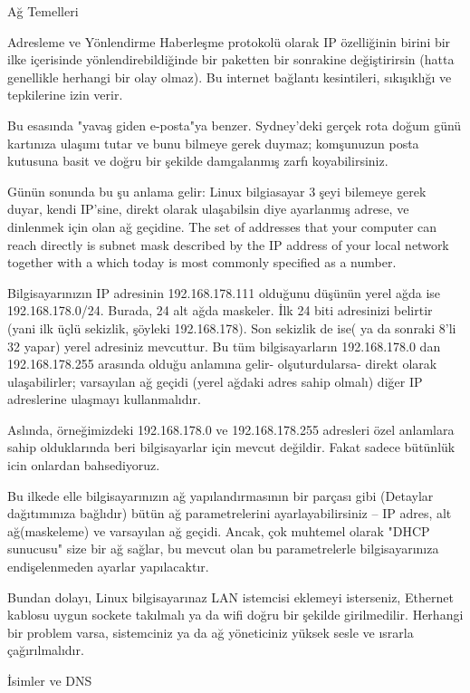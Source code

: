 \begin{section}{Ağ Temelleri}
\begin{subsection}{Adresleme ve Yönlendirme}
Haberleşme protokolü olarak IP özelliğinin birini bir ilke içerisinde yönlendirebildiğinde bir paketten bir sonrakine değiştirirsin (hatta genellikle herhangi bir olay olmaz). Bu internet bağlantı kesintileri, sıkışıklığı ve tepkilerine izin verir.

Bu esasında "yavaş giden e-posta"ya benzer. Sydney'deki gerçek rota doğum günü kartınıza ulaşımı tutar ve bunu bilmeye gerek duymaz; komşunuzun posta kutusuna basit ve doğru bir şekilde damgalanmış zarfı koyabilirsiniz.

Günün sonunda bu şu anlama gelir: Linux bilgiasayar 3 şeyi bilemeye gerek duyar, kendi IP'sine, direkt olarak ulaşabilsin diye ayarlanmış adrese, ve dinlenmek için olan ağ geçidine. The set of addresses that your computer can reach directly is subnet mask described by the IP address of your local network together with a which today is most commonly specified as a number.

Bilgisayarınızın IP adresinin 192.168.178.111 olduğunu düşünün yerel ağda ise 192.168.178.0/24. Burada, 24 alt ağda maskeler. İlk 24 biti adresinizi belirtir (yani ilk üçlü sekizlik, şöyleki 192.168.178). Son sekizlik de ise( ya da sonraki 8'li 32 yapar) yerel adresiniz mevcuttur. Bu tüm bilgisayarların 192.168.178.0 dan 192.168.178.255 arasında olduğu anlamına gelir- olşuturdularsa- direkt olarak ulaşabilirler; varsayılan ağ geçidi (yerel ağdaki adres sahip olmalı) diğer IP adreslerine ulaşmayı kullanmalıdır. 

Aslında, örneğimizdeki 192.168.178.0 ve 192.168.178.255 adresleri özel anlamlara sahip olduklarında beri bilgisayarlar için mevcut değildir. Fakat sadece bütünlük icin onlardan bahsediyoruz.

Bu ilkede elle bilgisayarınızın ağ yapılandırmasının bir parçası gibi (Detaylar dağıtımınıza bağlıdır) bütün ağ parametrelerini ayarlayabilirsiniz -- IP adres, alt ağ(maskeleme) ve varsayılan ağ geçidi. Ancak, çok muhtemel olarak "DHCP sunucusu" size bir ağ sağlar, bu mevcut olan bu parametrelerle bilgisayarınıza endişelenmeden ayarlar yapılacaktır.

Bundan dolayı, Linux bilgisayarınaz LAN istemcisi eklemeyi isterseniz, Ethernet kablosu uygun sockete takılmalı ya da wifi doğru bir şekilde girilmedilir. Herhangi bir problem varsa, sistemciniz ya da ağ yöneticiniz yüksek sesle ve ısrarla çağırılmalıdır.

\end{subsection}
\begin{subsection}{İsimler ve DNS}


\end{subsection}
\end{section}
